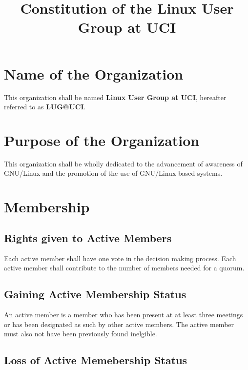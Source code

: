 \documentclass{article}
\title{Constitution of the Linux User Group at UCI}
\begin{document}
\maketitle

\section{Name of the Organization}

This organization shall be named \textbf{Linux User Group at UCI}, hereafter 
referred to as \textbf{LUG@UCI}.

\section{Purpose of the Organization}

This organization shall be wholly dedicated to the advancement of awareness of 
GNU/Linux and the promotion of the use of GNU/Linux based systems.

\section{Membership}




\subsection{Rights given to Active Members}

Each active member shall have one vote in the decision making process.
Each active member shall contribute to the number of members needed for a quorum.

\subsection{Gaining Active Membership Status}

An active member is a member who has been present at at least three meetings or
has been designated as such by other active members. The active member must also
not have been previously found inelgible.

\subsection{Loss of Active Memebership Status}
\end{document}
